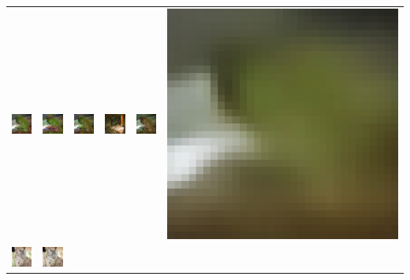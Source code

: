 \begin{table}[h!]
{\begin{tabular}{cccccc}
        \includegraphics[width=.145\textwidth]{chapter4/figures/images/cifar10/original/8.png} &   
        \includegraphics[width=.145\textwidth]{chapter4/figures/images/cifar10/reconstruction/8.png} &
        \includegraphics[width=.145\textwidth]{chapter4/figures/images/cifar10/corrected_reconstruction/8.png} &
        \includegraphics[width=.145\textwidth]{chapter4/figures/images/cifar10/diffusion_decoder_beta_0.01/8.png} &
        \includegraphics[width=.145\textwidth]{chapter4/figures/images/cifar10/diffusion_decoder_beta_0/8.png} &
        \includegraphics[width=.145\textwidth]{chapter4/figures/images/cifar10/VAE_reconstruction/8.png} \\
        \includegraphics[width=.145\textwidth]{chapter4/figures/images/cifar10/original/9.png} &   
        \includegraphics[width=.145\textwidth]{chapter4/figures/images/cifar10/reconstruction/9.png} &

\end{tabular}}
\end{table}
